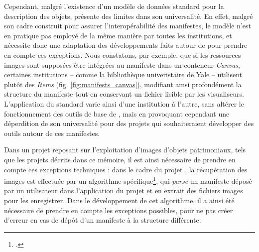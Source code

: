 	Cependant, malgré l'existence d'un modèle de données standard pour la description des objets, \iiif présente des limites dans son universalité. En effet, malgré son cadre construit pour assurer l'interopérabilité des manifestes, le modèle n'est en pratique pas employé de la même manière par toutes les institutions, et nécessite donc une adaptation des développements faits autour de \iiif pour prendre en compte ces exceptions. Nous constatons, par exemple, que si les ressources images sont supposées être intégrées au manifeste dans un conteneur \textit{Canvas}, certaines institutions -- comme la bibliothèque univeristaire de Yale -- utilisent plutôt des \textit{Items} (fig. \ref{fig:manifests_canvas}), modifiant ainsi profondément la structure du manifeste \iiif tout en conservant un fichier lisible par les visualiseurs. L'application du standard varie ainsi d'une institution à l'autre, sans altérer le fonctionnement des outils de base de \iiif, mais en provoquant cependant une déperdition de son universalité pour des projets qui souhaiteraient développer des outils autour de ces manifestes. 
	
	Dans un projet reposant sur l'exploitation d'images d'objets patrimoniaux, tels que les projets décrits dans ce mémoire, il est ainsi nécessaire de prendre en compte ces exceptions techniques : dans le cadre du projet \eida, la récupération des images est effectuée par un algorithme spécifique\footcite{albouyIiifdownloader2023}, qui \textit{parse} un manifeste \iiif déposé par un utilisateur dans l'application du projet et en extrait des fichiers images pour les enregistrer. Dans le développement de cet algorithme, il a ainsi été nécessaire de prendre en compte les exceptions possibles, pour ne pas créer d'erreur en cas de dépôt d'un manifeste à la structure différente.

